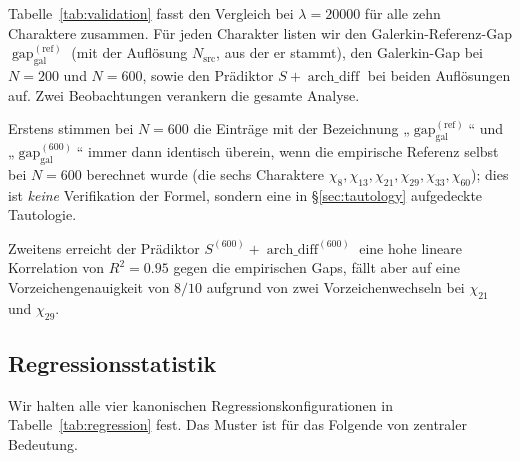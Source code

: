 \documentclass[10pt,twocolumn]{article}
\theoremstyle{definition}
\theoremstyle{remark}
\newcommand{\gap}{\operatorname{gap}}
\newcommand{\chifn}{\chi}
\newcommand{\archdiff}{\operatorname{arch\_diff}}
\begin{document}
Tabelle~\ref{tab:validation} fasst den Vergleich bei $\lambda=
20000$ für alle zehn Charaktere zusammen. Für jeden Charakter listen wir den
Galerkin-Referenz-Gap $\gap_{\mathrm{gal}}^{(\mathrm{ref})}$ (mit der Auflösung
$N_{\mathrm{src}}$, aus der er stammt), den Galerkin-Gap bei
$N=200$ und $N=600$, sowie den Prädiktor $S+\archdiff$ bei beiden
Auflösungen auf. Zwei Beobachtungen verankern die gesamte Analyse.

Erstens stimmen bei $N=600$ die Einträge mit der Bezeichnung „$\gap_{\mathrm{gal}}^{(\mathrm{ref})}$“ und
„$\gap_{\mathrm{gal}}^{(600)}$“ immer dann identisch überein, wenn die
empirische Referenz selbst bei $N=600$ berechnet wurde (die sechs
Charaktere $\chifn_8,\chifn_{13},\chifn_{21},\chifn_{29},\chifn_{33},
\chifn_{60}$); dies ist \emph{keine} Verifikation der Formel, sondern
eine in \S\ref{sec:tautology} aufgedeckte Tautologie.

Zweitens erreicht der Prädiktor $S^{(600)}+\archdiff^{(600)}$ eine hohe
lineare Korrelation von $R^2=0.95$ gegen die empirischen Gaps, fällt aber auf
eine Vorzeichengenauigkeit von $8/10$ aufgrund von zwei Vorzeichenwechseln bei $\chifn_{21}$
und $\chifn_{29}$.

\subsection{Regressionsstatistik}
\label{sec:validation-regression}

Wir halten alle vier kanonischen Regressionskonfigurationen in
Tabelle~\ref{tab:regression} fest. Das Muster ist für das Folgende von zentraler Bedeutung.
\end{document}

